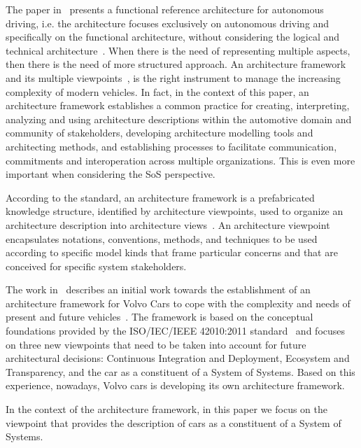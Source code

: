 

The paper in~\cite{BEHERE2016136} presents a functional reference architecture for autonomous driving, i.e. the architecture focuses exclusively on autonomous driving and specifically on the functional architecture, without considering the logical and technical architecture~\cite{AAF}. When there is the need of representing multiple aspects, then there is the need of more structured approach. 
An architecture framework and its multiple viewpoints~\cite{42010,JSA2017,AAF}, is the right instrument to manage the increasing complexity of modern vehicles. %
In fact, in the context of this paper, an architecture framework establishes a common practice for creating, interpreting, analyzing and using architecture descriptions within the automotive domain and community of stakeholders, developing architecture modelling tools and architecting methods, and establishing processes to facilitate communication, commitments and interoperation across multiple organizations. This is even more important when considering the SoS perspective. 

According to the standard, an architecture framework is a prefabricated knowledge structure, identified by architecture viewpoints, used to organize an architecture
description into architecture views~\cite{42010}. An architecture viewpoint encapsulates notations, conventions, methods, and techniques to be used according to specific model kinds that frame particular concerns and that are conceived for specific system
stakeholders. 


The work in~\cite{JSA2017} describes an initial work towards the establishment of an architecture framework for Volvo Cars to cope with the complexity and needs of present and future vehicles~\cite{JSA2017}. The framework is based on the conceptual foundations provided by the ISO/IEC/IEEE 42010:2011
standard~\cite{42010} and focuses on three new viewpoints that need to be taken into account for future architectural decisions: Continuous Integration and Deployment, Ecosystem and Transparency, and the car as a constituent of a System of Systems.
Based on this experience, nowadays, Volvo cars is developing its own architecture framework. 



In the context of the architecture framework, in this paper we focus on the viewpoint that provides the description of cars as a constituent of a System of Systems.

